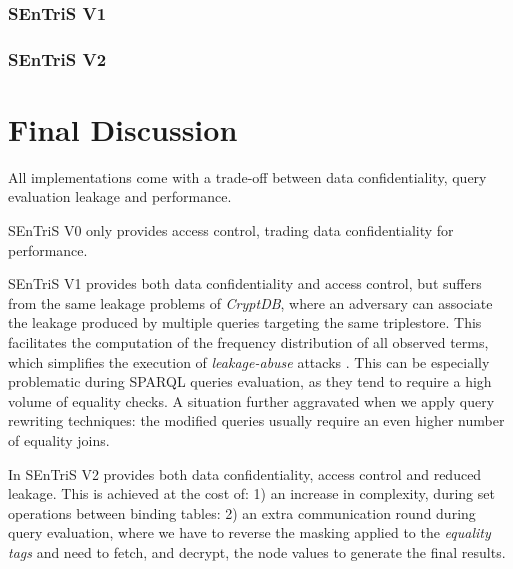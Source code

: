 \subsubsection{SEnTriS V1}
\subsubsection{SEnTriS V2}

\section{Final Discussion}

All implementations come with a trade-off between data confidentiality, query evaluation leakage and performance.

\gls{SEnTriS} V0 only provides access control, trading data confidentiality for performance.

\gls{SEnTriS} V1 provides both data confidentiality and access control, but suffers from the same leakage problems of \emph{CryptDB}, where an adversary can associate the leakage produced by multiple queries targeting the same triplestore. This facilitates the computation of the frequency distribution of all observed terms, which simplifies the execution of \emph{leakage-abuse} attacks \autocite{Jutla2021-af, Hahn2019-sg, Shafieinejad2021-rb}. This can be especially problematic during \gls{SPARQL} queries evaluation, as they tend to require a high volume of equality checks. A situation further aggravated when we apply query rewriting techniques: the modified queries usually require an even higher number of equality joins.

In \gls{SEnTriS} V2 provides both data confidentiality, access control and reduced leakage. This is achieved at the cost of: 1) an increase in complexity, during set operations between binding tables: 2) an extra communication round during query evaluation, where we have to reverse the masking applied to the \emph{equality tags} and need to fetch, and decrypt, the node values to generate the final results.